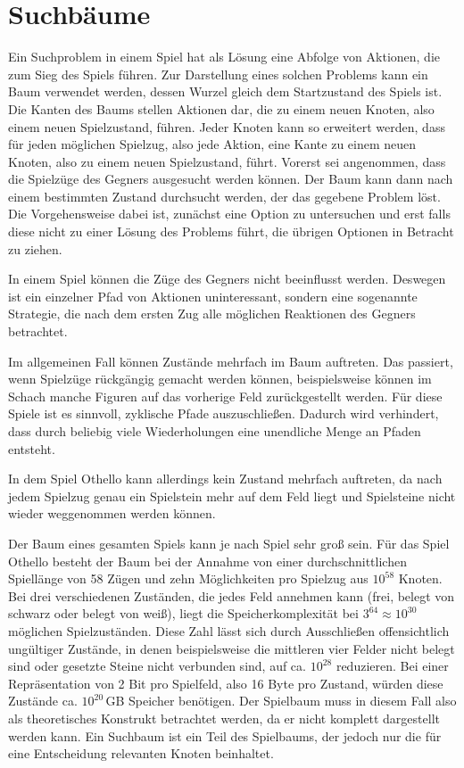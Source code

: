 \section{Suchbäume}


Ein Suchproblem in einem Spiel hat als Lösung eine Abfolge von Aktionen, die zum Sieg des Spiels führen. Zur Darstellung
eines solchen Problems kann ein Baum verwendet werden, dessen Wurzel gleich dem Startzustand des Spiels ist. Die Kanten
des Baums stellen Aktionen dar, die zu einem neuen Knoten, also einem neuen Spielzustand, führen. Jeder Knoten kann so
erweitert werden, dass für jeden möglichen Spielzug, also jede Aktion, eine Kante zu einem neuen Knoten, also zu einem
neuen Spielzustand, führt. Vorerst sei angenommen, dass die Spielzüge des Gegners ausgesucht werden können. Der Baum
kann dann nach einem bestimmten Zustand durchsucht werden, der das gegebene Problem löst. Die Vorgehensweise dabei ist,
zunächst eine Option zu untersuchen und erst falls diese nicht zu einer Lösung des Problems führt, die übrigen Optionen
in Betracht zu ziehen.
\cite[S.~75]{ai2010russel}

In einem Spiel können die Züge des Gegners nicht beeinflusst werden. Deswegen ist ein einzelner Pfad von Aktionen
uninteressant, sondern eine sogenannte Strategie, die nach dem ersten Zug alle möglichen Reaktionen des Gegners
betrachtet.
\cite[S.~163]{ai2010russel}

Im allgemeinen Fall können Zustände mehrfach im Baum auftreten. Das passiert, wenn Spielzüge rückgängig gemacht werden
können, beispielsweise können im Schach manche Figuren auf das vorherige Feld zurückgestellt werden. Für diese Spiele
ist es sinnvoll, zyklische Pfade auszuschließen. %
Dadurch wird verhindert, dass durch beliebig
viele Wiederholungen eine unendliche Menge an Pfaden entsteht.
\cite[S.~75]{ai2010russel}

In dem Spiel Othello kann allerdings kein Zustand mehrfach auftreten, da nach jedem Spielzug genau ein Spielstein mehr
auf dem Feld liegt und Spielsteine nicht wieder weggenommen werden können.

Der Baum eines gesamten Spiels kann je nach Spiel sehr groß sein. Für das Spiel Othello besteht der Baum bei der Annahme
von einer durchschnittlichen Spiellänge von 58 Zügen und zehn Möglichkeiten pro Spielzug aus $10^{58}$ Knoten. Bei drei
verschiedenen Zuständen, die jedes Feld annehmen kann (frei, belegt von schwarz oder belegt von weiß), liegt die
Speicherkomplexität bei $3^{64}\approx10^{30}$ möglichen Spielzuständen. Diese Zahl lässt sich durch Ausschließen
offensichtlich ungültiger Zustände, in denen beispielsweise die mittleren vier Felder nicht belegt sind oder gesetzte
Steine nicht verbunden sind, auf ca. $10^{28}$ reduzieren.
\cite[S.~167]{searchingforsolutions}
Bei einer Repräsentation von 2 Bit pro Spielfeld, also 16 Byte pro Zustand, würden diese Zustände ca. $10^{20}$\,GB
Speicher benötigen. Der Spielbaum muss in diesem Fall also als theoretisches Konstrukt betrachtet werden, da er nicht
komplett dargestellt werden kann. Ein Suchbaum ist ein Teil des Spielbaums, der jedoch nur die für eine Entscheidung
relevanten Knoten beinhaltet.
\cite[S.~162f.]{ai2010russel}
